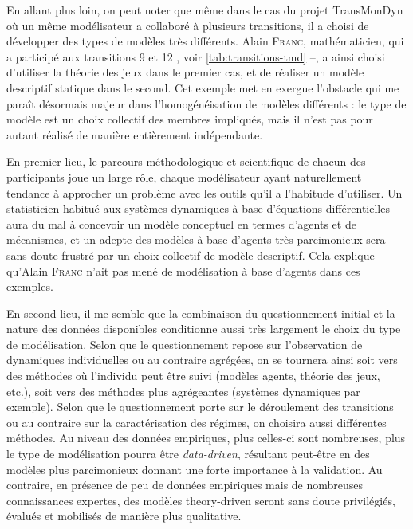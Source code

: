 En allant plus loin, on peut noter que même dans le cas du projet TransMonDyn où un même modélisateur a collaboré à plusieurs transitions, il a choisi de développer des types de modèles très différents.
Alain \textsc{Franc}, mathématicien, qui a participé aux transitions 9 \autocite{ouriachi_transition_2017} et 12 \autocite{bretagnolle_transition_2017}, voir \cref{tab:transitions-tmd} --, a ainsi choisi d'utiliser la théorie des jeux dans le premier cas, et de réaliser un modèle descriptif statique dans le second.
Cet exemple met en exergue l'obstacle qui me paraît désormais majeur dans l'homogénéisation de modèles différents : le type de modèle est un choix collectif des membres impliqués, mais il n'est pas pour autant réalisé de manière entièrement indépendante.

En premier lieu, le parcours méthodologique et scientifique de chacun des participants joue un large rôle, chaque modélisateur ayant naturellement tendance à approcher un problème avec les outils qu'il a l'habitude d'utiliser.
Un statisticien habitué aux systèmes dynamiques à base d'équations différentielles aura du mal à concevoir un modèle conceptuel en termes d'agents et de mécanismes, et un adepte des modèles à base d'agents très parcimonieux sera sans doute frustré par un choix collectif de modèle descriptif.
Cela explique qu'Alain \textsc{Franc} n'ait pas mené de modélisation à base d'agents dans ces exemples.

En second lieu, il me semble que la combinaison du questionnement initial et la nature des données disponibles conditionne aussi très largement le choix du type de modélisation.
Selon que le questionnement repose sur l'observation de dynamiques individuelles ou au contraire agrégées, on se tournera ainsi soit vers des méthodes où l'individu peut être suivi (modèles agents, théorie des jeux, etc.), soit vers des méthodes plus agrégeantes (systèmes dynamiques par exemple).
Selon que le questionnement porte sur le déroulement des \og transitions\fg{} ou au contraire sur la caractérisation des \og régimes\fg{}, on choisira aussi différentes méthodes.
Au niveau des données empiriques, plus celles-ci sont nombreuses, plus le type de modélisation pourra être \og \textit{data-driven}\fg, résultant peut-être en des modèles plus parcimonieux donnant une forte importance à la validation.
Au contraire, en présence de peu de données empiriques mais de nombreuses connaissances expertes, des modèles \og theory-driven\fg{} seront sans doute privilégiés, évalués et mobilisés de manière plus qualitative.


